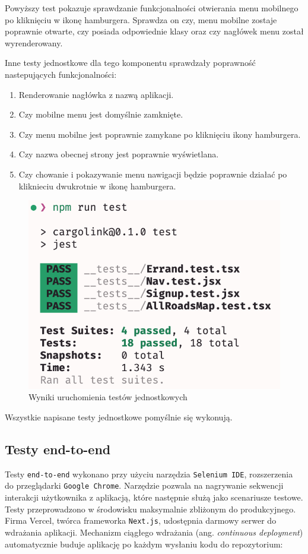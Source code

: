 Powyższy test pokazuje sprawdzanie funkcjonalności otwierania menu mobilnego po kliknięciu w ikonę hamburgera. Sprawdza on czy, menu mobilne zostaje poprawnie otwarte, czy posiada odpowiednie klasy oraz czy nagłówek menu został wyrenderowany.

Inne testy jednostkowe dla tego komponentu sprawdzały poprawność nastepujących funkcjonalności:
\begin{enumerate}
  \item Renderowanie nagłówka z nazwą aplikacji.
  \item Czy mobilne menu jest domyślnie zamknięte.
  \item Czy menu mobilne jest poprawnie zamykane po kliknięciu ikony hamburgera.
  \item Czy nazwa obecnej strony jest poprawnie wyświetlana.
  \item Czy chowanie i pokazywanie menu nawigacji będzie poprawnie działać po kliknieciu dwukrotnie w ikonę hamburgera.
\end{enumerate}

\begin{figure}[H]
	\centering
		\includegraphics[width=0.5\linewidth]{rozdzial2/testy_jednostkowe_wyniki.png}
	\caption{Wyniki uruchomienia testów jednostkowych}
	\label{Testy jednostkowe wyniki}
\end{figure}

Wszystkie napisane testy jednostkowe pomyślnie się wykonują.

\subsection{Testy end-to-end}

Testy \texttt{end-to-end} wykonano przy użyciu narzędzia \texttt{Selenium IDE}, rozszerzenia do przeglądarki \texttt{Google Chrome}. Narzędzie pozwala na nagrywanie sekwencji interakcji użytkownika z aplikacją, które następnie służą jako scenariusze testowe.
Testy przeprowadzono w środowisku maksymalnie zbliżonym do produkcyjnego. Firma Vercel, twórca frameworka \texttt{Next.js}, udostępnia darmowy serwer do wdrażania aplikacji. Mechanizm ciągłego wdrażania (ang. \emph{continuous deployment}) automatycznie buduje aplikację po każdym wysłaniu kodu do repozytorium:

